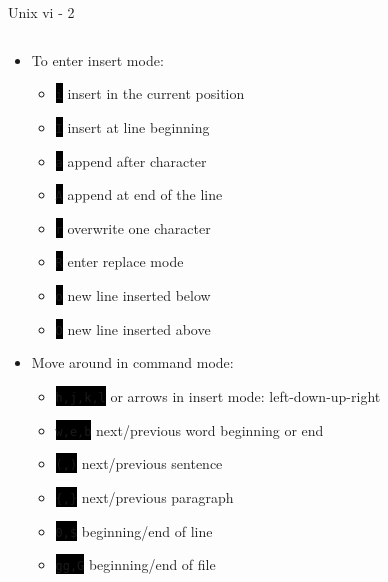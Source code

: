 \documentclass[unknownkeysallowed, 10pt, a4 paper, handout]{beamer}
\newcommand{\code}[1]{\colorbox{black}{\color{green}\texttt{#1}}}
\begin{document}
\begin{frame}[label=vim2]{Unix vi - 2}
  \begin{columns}[T]
    \begin{column}{.83\textwidth}
      \begin{itemize}
        \item To enter insert mode:
        \begin{itemize}
           \item \code{i} insert in the current position
           \item \code{I} insert at line beginning
           \item \code{a} append after character
           \item \code{A} append at end of the line
           \item \code{r} overwrite one character
           \item \code{R} enter replace mode
           \item \code{o} new line inserted below
           \item \code{O} new line inserted above
        \end{itemize}
        \item Move around in command mode:
        \begin{itemize}
          \item \code{h,j,k,l} or arrows in insert mode: left-down-up-right
          \item \code{w,e,b} next/previous word beginning or end
          \item \code{(,)} next/previous sentence 
          \item \code{\{,\}} next/previous paragraph 
          \item \code{0,\$} beginning/end of line
          \item \code{gg,G} beginning/end of file
        \end{itemize}
      \end{itemize}
    \end{column}
    \hfill
    \begin{column}{.25\textwidth}

\end{column}
\end{columns}
\end{frame}
\end{document}
